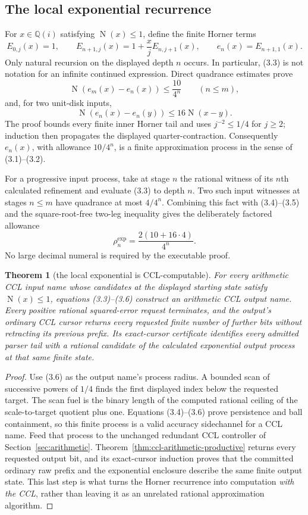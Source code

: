\documentclass[10pt]{article}
\newtheorem{theorem}{Theorem}[section]
\theoremstyle{definition}
\theoremstyle{remark}
\newcommand{\Qi}{\mathbb{Q}(i)}
\newcommand{\Norm}{\operatorname{N}}
\begin{document}
\subsection{The local exponential recurrence}

For $x\in\Qi$ satisfying $\Norm(x)\le1$, define the finite Horner terms
\[
 E_{0,j}(x)=1,
 \qquad
 E_{n+1,j}(x)=1+\frac{x}{j}E_{n,j+1}(x),
 \qquad
 e_n(x)=E_{n+1,1}(x).
 \tag{3.3}
\]
Only natural recursion on the displayed depth $n$ occurs.  In particular,
(3.3) is not notation for an infinite continued expression.  Direct
quadrance estimates prove
\[
 \Norm(e_m(x)-e_n(x))\le \frac{10}{4^n}
 \qquad(n\le m),
 \tag{3.4}
\]
and, for two unit-disk inputs,
\[
 \Norm(e_n(x)-e_n(y))\le16\Norm(x-y).
 \tag{3.5}
\]
The proof bounds every finite inner Horner tail and uses
$j^{-2}\le1/4$ for $j\ge2$; induction then propagates the displayed
quarter-contraction.  Consequently $e_n(x)$, with allowance $10/4^n$, is a
finite approximation process in the sense of (3.1)--(3.2).

For a progressive input process, take at stage $n$ the rational witness of
its $n$th calculated refinement and evaluate (3.3) to depth $n$.  Two such
input witnesses at stages $n\le m$ have quadrance at most $4/4^n$.  Combining
this fact with (3.4)--(3.5) and the square-root-free two-leg inequality
gives the deliberately factored allowance
\[
 \rho_n^{\exp}=\frac{2(10+16\cdot4)}{4^n}.
 \tag{3.6}
\]
No large decimal numeral is required by the executable proof.

\begin{theorem}[the local exponential is CCL-computable]
For every arithmetic CCL input name whose candidates at the displayed
starting state satisfy $\Norm(x)\le1$, equations (3.3)--(3.6) construct an
arithmetic CCL output name.  Every positive rational squared-error request
terminates, and the output's ordinary CCL cursor returns every requested
finite number of further bits without retracting its previous prefix.  Its
exact-cursor certificate identifies every admitted parser tail with a
rational candidate of the calculated exponential output process at that same
finite state.
\end{theorem}

\begin{proof}
Use (3.6) as the output name's process radius.  A bounded scan of successive
powers of $1/4$ finds the first displayed index below the requested target.
The scan fuel is the binary length of the computed rational ceiling of the
scale-to-target quotient plus one.  Equations (3.4)--(3.6) prove
persistence and ball containment, so this finite process is a valid accuracy
sidechannel for a CCL name.  Feed that process to the unchanged redundant CCL
controller of Section~\ref{sec:arithmetic}.
Theorem~\ref{thm:ccl-arithmetic-productive} returns
every requested output bit, and its exact-cursor induction proves that the
committed ordinary raw prefix and the exponential enclosure describe the
same finite output state.  This last step is what turns the Horner recurrence
into computation \emph{with the CCL}, rather than leaving it as an unrelated
rational approximation algorithm.
\end{proof}
\end{document}
